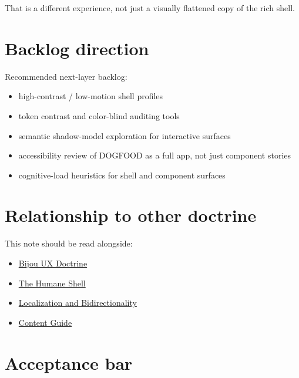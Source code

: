 That is a different experience, not just a visually flattened copy of the rich shell.

\section{Backlog direction}\label{record-032-backlog-direction}

Recommended next-layer backlog:

\begin{itemize}
\tightlist
\item
  high-contrast / low-motion shell profiles
\item
  token contrast and color-blind auditing tools
\item
  semantic shadow-model exploration for interactive surfaces
\item
  accessibility review of DOGFOOD as a full app, not just component stories
\item
  cognitive-load heuristics for shell and component surfaces
\end{itemize}

\section{Relationship to other doctrine}\label{record-032-relationship-to-other-doctrine}

This note should be read alongside:

\begin{itemize}
\tightlist
\item
  \href{https://github.com/flyingrobots/bijou/blob/cbd70612140e7a450d764b3c7be1c6af878b99bc/docs/strategy/bijou-ux-doctrine.md}{Bijou UX Doctrine}
\item
  \href{https://github.com/flyingrobots/bijou/blob/cbd70612140e7a450d764b3c7be1c6af878b99bc/docs/strategy/humane-shell.md}{The Humane Shell}
\item
  \href{https://github.com/flyingrobots/bijou/blob/cbd70612140e7a450d764b3c7be1c6af878b99bc/docs/strategy/localization-and-bidirectionality.md}{Localization and Bidirectionality}
\item
  \href{https://github.com/flyingrobots/bijou/blob/cbd70612140e7a450d764b3c7be1c6af878b99bc/docs/strategy/content-guide.md}{Content Guide}
\end{itemize}

\section{Acceptance bar}\label{record-032-acceptance-bar}

